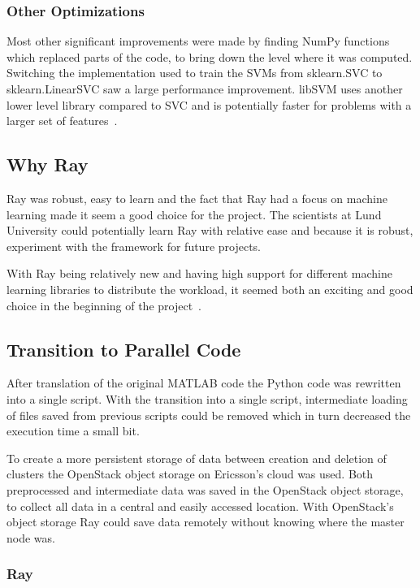 \documentclass[12pt, a4paper]{article}
\begin{document}
\subsubsection{Other Optimizations}

Most other significant improvements were made by finding NumPy functions which replaced parts of the code, to bring down the level where it was computed.
Switching the implementation used to train the SVMs from sklearn.SVC to sklearn.LinearSVC saw a large performance improvement.
libSVM uses another lower level library compared to SVC and is potentially faster for problems with a larger set of features~\cite{LinearSVC,SVMSVC}.

\subsection{Why Ray}

Ray was robust, easy to learn and the fact that Ray had a focus on machine learning made it seem a good choice for the project.
The scientists at Lund University could potentially learn Ray with relative ease and because it is robust, experiment with the framework for future projects.

With Ray being relatively new and having high support for different machine learning libraries to distribute the workload, it seemed both an exciting and good choice in the beginning of the project~\cite{ray:RaySGD, ray:Rayrllib, ray:RayTune, ray:RaySklearn}. 

\subsection{Transition to Parallel Code}
After translation of the original MATLAB code the Python code was
rewritten into a single script.
With the transition into a single script, intermediate loading of files saved from previous scripts could be removed which in turn decreased the execution time a small bit.

To create a more persistent storage of data between creation and deletion of clusters the OpenStack object storage on Ericsson's cloud was used.
Both preprocessed and intermediate data was saved in the OpenStack object storage, to collect all data in a central and easily accessed location.
With OpenStack's object storage Ray could save data remotely without knowing where the master node was.

\subsubsection{Ray}
\end{document}
